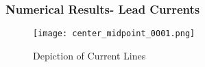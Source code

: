 \documentclass[]{beamer}
\begin{document}
   \begin{frame}
      \frametitle{Numerical Results- Lead Currents}
            \centering
            \begin{figure}
            \texttt{[image: center\_midpoint\_0001.png]}
            \caption{Depiction of Current Lines}
            \end{figure}
  \end{frame}
















\end{document}
